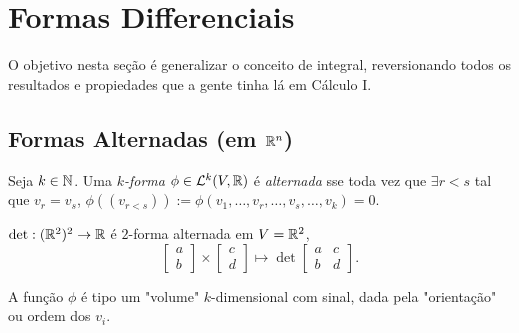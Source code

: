 \section{Formas Differenciais}

O objetivo nesta seção é generalizar o conceito de integral, reversionando todos os resultados e propiedades que a gente tinha lá em Cálculo I. 


\newcommand{\alt}{A}
\subsection*{Formas Alternadas (em \(\mathbb{R}^n\))}

\begin{definition}
    Seja \(k \in \mathbb{N}\). Uma \emph{$k$-forma} \(\phi \in \mathcal{L}^k(V, \mathbb{R} )\) é \emph{alternada} sse  toda vez que \(\exists r<s\)  tal que \(v_r =v_s\), \(\phi((v_{r<s})):= \phi(v_1, \ldots, v_r, \ldots, v_s, \ldots, v_k) = 0\). 
\end{definition}


\parbox[l]{0.7\linewidth}{
\begin{example}
    \(\det : (\mathbb{R}^2)^2 \to \mathbb{R}\) é \(2\)-forma alternada em \(V= \mathbb{R}^2\), 
    \[\begin{bmatrix}
        a \\ b
    \end{bmatrix}\times \begin{bmatrix}
        c \\ d
    \end{bmatrix} \mapsto \det\begin{bmatrix}
        a & c \\ 
        b & d
    \end{bmatrix}.\]  
\end{example}

\begin{note}
    A função \(\phi\) é tipo um "volume" \(k\)-dimensional com sinal, dada pela "orientação" ou ordem dos \(v_i\). 
\end{note}
}

